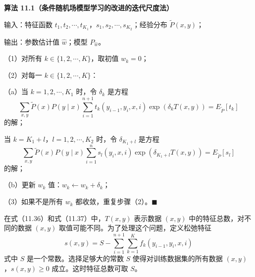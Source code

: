 \documentclass[UTF8, 12pt, fontset=fandol, oneside]{ctexart}
\begin{document}
\noindent\textbf{算法 11.1（条件随机场模型学习的改进的迭代尺度法）}

输入：特征函数 $t_1,t_2,\cdots,t_{K_1}$，$s_1,s_2,\cdots,s_{K_2}$；经验分布 $\tilde P(x,y)$；

输出：参数估计值 $\hat w$；模型 $P_{\hat w}$。

（1）对所有 $k\in\{1,2,\cdots,K\}$，取初值 $w_k=0$；

（2）对每一 $k\in\{1,2,\cdots,K\}$：

（a）当 $k=1,2,\cdots,K_1$ 时，令 $\delta_k$ 是方程
\[
\sum_{x,y}\tilde P(x)P(y\mid x)\sum_{i=1}^{n+1}t_k(y_{i-1},y_i,x,i)\exp(\delta_kT(x,y))=E_{\tilde P}[t_k]
\]
的解；

当 $k=K_1+l$，$l=1,2,\cdots,K_2$ 时，令 $\delta_{K_1+l}$ 是方程
\[
\sum_{x,y}\tilde P(x)P(y\mid x)\sum_{i=1}^{n}s_l(y_i,x,i)\exp(\delta_{K_1+l}T(x,y))=E_{\tilde P}[s_l]
\]
的解；

（b）更新 $w_k$ 值：$w_k\leftarrow w_k+\delta_k$；

（3）如果不是所有 $w_k$ 都收敛，重复步骤（2）。\hfill$\blacksquare$

在式（11.36）和式（11.37）中，$T(x,y)$ 表示数据 $(x,y)$ 中的特征总数，对不同的数据 $(x,y)$ 取值可能不同。为了处理这个问题，定义松弛特征
\begin{equation}
s(x,y)=S-\sum_{i=1}^{n+1}\sum_{k=1}^{K}f_k(y_{i-1},y_i,x,i)
\tag{11.39}
\end{equation}
式中 $S$ 是一个常数。选择足够大的常数 $S$ 使得对训练数据集的所有数据 $(x,y)$，$s(x,y)\ge0$ 成立。这时特征总数可取 $S$。
\end{document}
